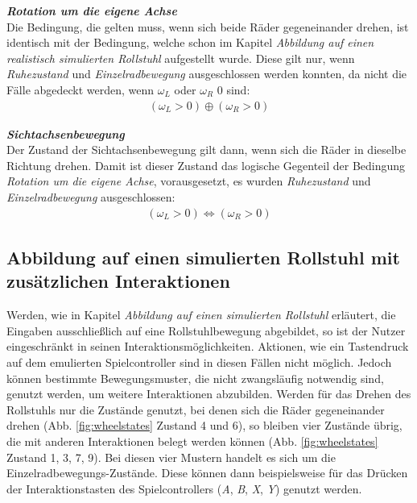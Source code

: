 \textbf{\textit{Rotation um die eigene Achse}}\\
Die Bedingung, die gelten muss, wenn sich beide Räder gegeneinander drehen, ist identisch mit der Bedingung, welche schon im Kapitel \textit{Abbildung auf einen realistisch simulierten Rollstuhl} aufgestellt wurde.
Diese gilt nur, wenn \textit{Ruhezustand} und \textit{Einzelradbewegung} ausgeschlossen werden konnten, da nicht die Fälle abgedeckt werden, wenn $\omega_L$ oder $\omega_R$ 0 sind:
\begin{align}
    (\omega_L > 0) \oplus (\omega_R > 0)
\end{align}

\textbf{\textit{Sichtachsenbewegung}}\\
Der Zustand der Sichtachsenbewegung gilt dann, wenn sich die Räder in dieselbe Richtung drehen.
Damit ist dieser Zustand das logische Gegenteil der Bedingung \textit{Rotation um die eigene Achse}, vorausgesetzt, es wurden \textit{Ruhezustand} und \textit{Einzelradbewegung} ausgeschlossen:
\begin{align}
    (\omega_L > 0) \Leftrightarrow (\omega_R > 0)
\end{align}

\subsection{Abbildung auf einen simulierten Rollstuhl mit zusätzlichen Interaktionen}
Werden, wie in Kapitel \textit{Abbildung auf einen simulierten Rollstuhl} erläutert, die Eingaben ausschließlich auf eine Rollstuhlbewegung abgebildet, so ist der Nutzer eingeschränkt in seinen Interaktionsmöglichkeiten.
Aktionen, wie ein Tastendruck auf dem emulierten Spielcontroller sind in diesen Fällen nicht möglich.
Jedoch können bestimmte Bewegungsmuster, die nicht zwangsläufig notwendig sind, genutzt werden, um weitere Interaktionen abzubilden.
Werden für das Drehen des Rollstuhls nur die Zustände genutzt, bei denen sich die Räder gegeneinander drehen (Abb. \ref{fig:wheelstates} Zustand 4 und 6), so bleiben vier Zustände übrig, die mit anderen Interaktionen belegt werden können (Abb. \ref{fig:wheelstates} Zustand 1, 3, 7, 9).
Bei diesen vier Mustern handelt es sich um die Einzelradbewegungs-Zustände.
Diese können dann beispielsweise für das Drücken der Interaktionstasten des Spielcontrollers (\textit{A}, \textit{B}, \textit{X}, \textit{Y}) genutzt werden.

